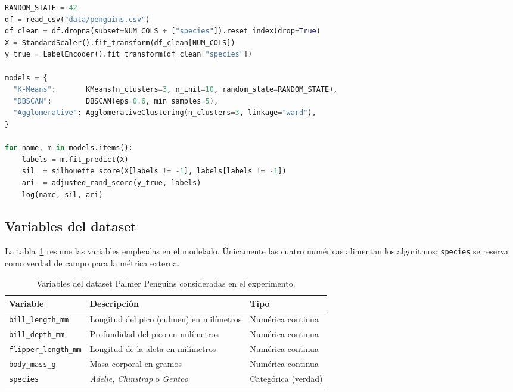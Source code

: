 \begin{lstlisting}[language=Python,caption={Pipeline esencial de minería de datos.}]
RANDOM_STATE = 42
df = read_csv("data/penguins.csv")
df_clean = df.dropna(subset=NUM_COLS + ["species"]).reset_index(drop=True)
X = StandardScaler().fit_transform(df_clean[NUM_COLS])
y_true = LabelEncoder().fit_transform(df_clean["species"])

models = {
  "K-Means":       KMeans(n_clusters=3, n_init=10, random_state=RANDOM_STATE),
  "DBSCAN":        DBSCAN(eps=0.6, min_samples=5),
  "Agglomerative": AgglomerativeClustering(n_clusters=3, linkage="ward"),
}

for name, m in models.items():
    labels = m.fit_predict(X)
    sil  = silhouette_score(X[labels != -1], labels[labels != -1])
    ari  = adjusted_rand_score(y_true, labels)
    log(name, sil, ari)
\end{lstlisting}

\subsection{Variables del dataset}

La tabla~\ref{tab:variables} resume las variables empleadas en el modelado. Únicamente las cuatro numéricas alimentan los algoritmos; \texttt{species} se reserva como verdad de campo para la métrica externa.

\begin{table}[H]
\centering
\caption{Variables del dataset Palmer Penguins consideradas en el experimento.}
\label{tab:variables}
\begin{tabularx}{\textwidth}{lXl}
\toprule
\textbf{Variable} & \textbf{Descripción} & \textbf{Tipo}\\
\midrule
\texttt{bill\_length\_mm}     & Longitud del pico (culmen) en milímetros          & Numérica continua\\
\texttt{bill\_depth\_mm}      & Profundidad del pico en milímetros                & Numérica continua\\
\texttt{flipper\_length\_mm}  & Longitud de la aleta en milímetros                & Numérica continua\\
\texttt{body\_mass\_g}        & Masa corporal en gramos                            & Numérica continua\\
\texttt{species}              & \emph{Adelie}, \emph{Chinstrap} o \emph{Gentoo}   & Categórica (verdad)\\
\bottomrule
\end{tabularx}
\end{table}
